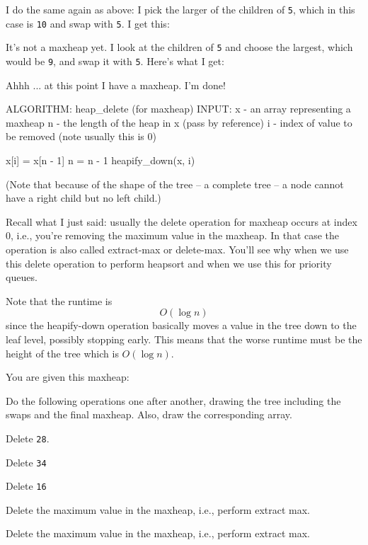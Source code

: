 I do the same again as above: I pick the larger of the children
of \texttt{5}, which in this case is \texttt{10} and swap with \texttt{5}.
I get this:



It's not a maxheap yet.
I look at the children of \texttt{5} and choose the largest,
which would be \texttt{9}, and swap it with \texttt{5}.
Here's what I get:



Ahhh ... at this point I have a maxheap.
I'm done!

\begin{console}[commandchars=\\\{\}]
  ALGORITHM: heap_delete (for maxheap)
  INPUT: x - an array representing a maxheap
  n - the length of the heap in x (pass by reference)
  i - index of value to be removed (note usually
  this is 0)

  x[i] = x[n - 1]
  n = n - 1
  heapify_down(x, i)
\end{console}

(Note that because of the shape of the tree -- a complete tree --
a node cannot have a right child but no left child.)

Recall what I just said: usually the delete operation for maxheap
occurs at index 0, i.e., you're removing the maximum value in the maxheap.
In that case the operation is also called extract-max or delete-max.
You'll see why when we use this delete operation to perform heapsort
and when we use this for priority queues.

Note that the runtime is
\[
  O(\log n)
\]
since the heapify-down operation basically moves
a value in the tree down to the leaf level, possibly stopping
early.
This means that the worse runtime must be
the height of the tree which is $O(\log n)$.

\newpage
\begin{ex}
  You are given this maxheap:

  

  Do the following operations one after another,
  drawing the tree including the swaps
  and the final
  maxheap.
  Also, draw the corresponding array.
  \begin{tightlist}
  \item Delete \texttt{28}.
  \item Delete \texttt{34}
  \item Delete \texttt{16}
  \item Delete the maximum value in the maxheap, i.e., perform extract max.
  \item Delete the maximum value in the maxheap, i.e., perform extract max.
  \end{tightlist}
\end{ex}

